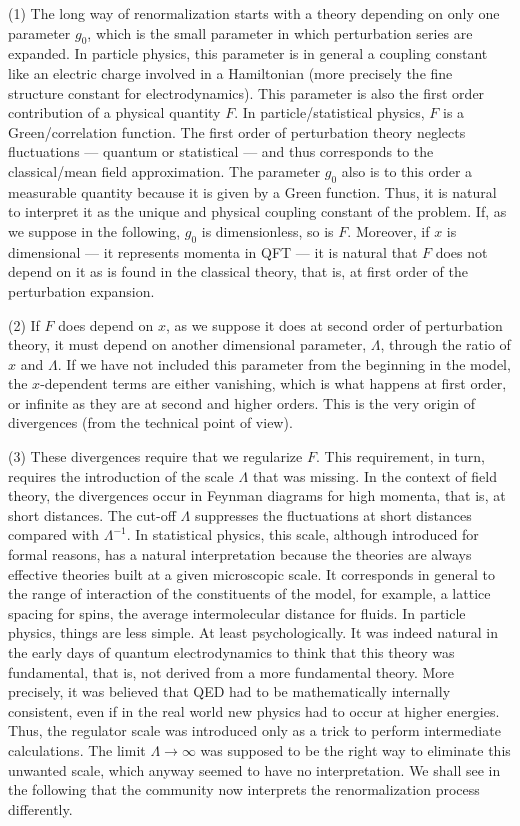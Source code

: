 \documentclass[floatfix,preprintnumbers,amsmath,amssymb,prb,12pt]{revtex4-1}
\begin{document}
{(1) The long way of renormalization starts with a theory
depending on only one parameter $g_0$, which is the small
parameter in which perturbation series are expanded. In particle
physics, this parameter is in general a coupling constant like an
electric charge involved in a Hamiltonian (more precisely the fine
structure constant for electrodynamics). This parameter is also
the first order contribution of a physical quantity $F$. In
particle/statistical physics,
$F$ is a Green/correlation function. The first order of
perturbation theory neglects fluctuations --- quantum or
statistical --- and thus corresponds to the classical/mean field
approximation. The parameter $g_0$ also is to this order a
measurable quantity because it is given by a Green function. Thus,
it is natural to interpret it as the unique and physical coupling
constant of the problem. If, as we suppose in the following, $g_0$
is dimensionless, so is $F$. Moreover, if $x$ is dimensional ---
it represents momenta in QFT --- it is natural that $F$ does not 
depend on it as is found in the classical theory, that is, at
first order of the perturbation expansion.

(2) If $F$ does depend on $x$, as we suppose it does at second
order of perturbation theory, it must depend on another
dimensional parameter, $\Lambda$, through the ratio of $x$ and 
$\Lambda$. If we have not included this parameter from the
beginning in the model, the $x$-dependent terms are either
vanishing, which is what happens at first order, or infinite as
they are at second and higher orders. This is the very origin of
divergences (from the technical point of view).

(3) These divergences require that we regularize $F$. This
requirement, in turn, requires the introduction of the scale
$\Lambda$ that was missing. In the context of field theory, the
divergences occur in Feynman diagrams for high momenta, that is,
at short distances. The cut-off
$\Lambda$ suppresses the fluctuations at short distances compared
with $\Lambda^{-1}$. In statistical physics, this scale, although
 introduced for formal reasons, has a natural
interpretation because the theories are always 
effective theories built at a given microscopic scale. It
corresponds in general to the range of interaction of the
constituents of the model, for example, a lattice spacing for
spins, the average intermolecular distance for fluids. In
particle physics, things are less simple. At least
psychologically. It was indeed natural in the early days of
quantum electrodynamics to think that this theory was fundamental,
that is, not derived from a more fundamental theory. More
precisely, it was believed that QED had to be mathematically
internally consistent, even if in the real world new physics had to
occur at higher energies. Thus, the regulator scale was introduced
only as a trick to perform intermediate calculations. The limit
$\Lambda\to\infty$ was supposed to be the right way to eliminate
this unwanted scale, which anyway seemed to have no interpretation.
We shall see in the following that the community now interprets 
the renormalization process differently.

}
\end{document}
